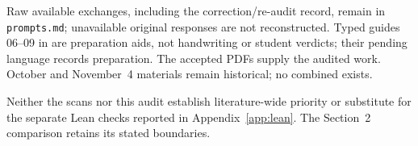 \documentclass[11pt]{article}
\theoremstyle{definition}
\begin{document}
Raw available exchanges, including the correction/re-audit record, remain in \texttt{prompts.md}; unavailable original responses are not reconstructed. Typed guides 06--09 in  are preparation aids, not handwriting or student verdicts; their pending language records preparation. The accepted PDFs supply the audited work. October and November~4 materials remain historical; no combined  exists.

Neither the scans nor this audit establish literature-wide priority or substitute for the separate Lean checks reported in Appendix~\ref{app:lean}. The Section~2 comparison retains its stated boundaries.
\end{document}
